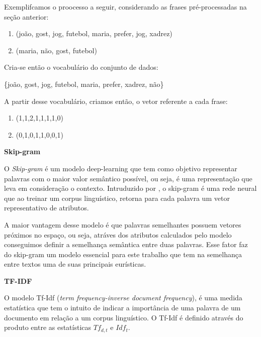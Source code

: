 \documentclass[a4paper,12pt]{article}
\begin{document}
\begin{description}
   Exemplifcamos o proocesso a seguir, considerando as frases pré-processadas na seção anterior:
   
    \begin{center}
      \begin{enumerate}
	\item (joão, gost, jog, futebol, maria, prefer, jog, xadrez)
	\item (maria, não, gost, futebol)
      \end{enumerate}
    \end{center}
    
    Cria-se então o vocabulário do conjunto de dados:
    
   \begin{center}
    \{joão, gost, jog, futebol, maria, prefer, xadrez, não\}
   \end{center}

   A partir desse vocabulário, criamos então, o vetor referente a cada frase:

    \begin{center}
      \begin{enumerate}
	\item (1,1,2,1,1,1,1,0)
	\item (0,1,0,1,1,0,0,1)
      \end{enumerate}
    \end{center}
   
 
 \item \textbf{Skip-gram}

  O \textit{Skip-gram} é um modelo deep-learning que tem como objetivo representar palavras com o maior valor semântico possível, ou seja,
  é uma representação que leva em consideração o contexto. Intruduzido
  por \cite{mikolov2013efficient}, o skip-gram é uma rede neural que ao treinar um corpus linguístico, retorna para cada palavra um vetor 
  representativo de atributos.
  
  A maior vantagem desse modelo é que palavras semelhantes possuem vetores próximos no espaço, ou seja, atráves dos atributos calculados pelo
  modelo conseguimos definir a semelhança semântica entre duas palavras. Esse fator faz do skip-gram um modelo essencial para este trabalho
  que tem na semelhança entre textos uma de suas principais eurísticas.
  
 \item \textbf{TF-IDF}
 
  O modelo Tf-Idf (\textit{term frequency-inverse document frequency}), é uma medida estatística que tem o intuito de indicar
  a importância de uma palavra de um documento em relação a um corpus linguístico. O Tf-Idf é definido através do produto entre as 
  estatísticas $Tf_{d,t}$ e $Idf_{t}$.


\end{description}
\end{document}
